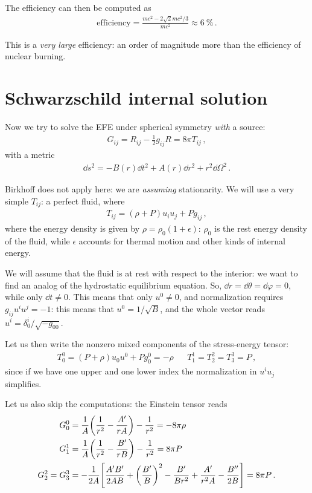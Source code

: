\documentclass[main.tex]{subfiles}
\begin{document}
The efficiency can then be computed as 
%
\begin{align}
\text{efficiency} = \frac{mc^2 - 2 \sqrt{2} mc^2 / 3}{mc^2} \approx \SI{6}{\percent}
\,.
\end{align}

This is a \emph{very large} efficiency: an order of magnitude more than the efficiency of nuclear burning. 

\section{Schwarzschild internal solution}

Now we try to solve the EFE under spherical symmetry \emph{with} a source: 
%
\begin{align}
G_{ij} = R_{ij} - \frac{1}{2} g_{ij} R = 8 \pi T_{ij}
\,,
\end{align}
%
with a metric 
%
\begin{align}
\dd{s^2} = - B(r) \dd{t^2} + A(r) \dd{r^2} + r^2 \dd{\Omega^2}
\,.
\end{align}

Birkhoff does not apply here: we are \emph{assuming} stationarity.
We will use a very simple \(T_{ij}\): a perfect fluid, where 
%
\begin{align}
T_{ij} 
= (\rho + P) u_i u_j + P g_{ij} 
\,,
\end{align}
%
where the energy density is given by \(\rho = \rho_0 ( 1+ \epsilon )\): \(\rho_0\) is the rest energy density of the fluid, while \(\epsilon \) accounts for thermal motion and other kinds of internal energy.

We will assume that the fluid is at rest with respect to the interior: we want to find an analog of the hydrostatic equilibrium equation. 
So, \(\dd{r} = \dd{\theta } = \dd{\varphi } = 0\), while only \(\dd{t} \neq 0\). This means that only \(u^{0} \neq 0\), and normalization requires \(g_{ij} u^{i} u^{j} = -1\): this means that \(u^{0} =  1/ \sqrt{B}\), and the whole vector reads \(u^{i} = \delta^{i}_{0} / \sqrt{-g_{00} }\).

Let us then write the nonzero mixed components of the stress-energy tensor: 
%
\begin{align}
T^{0}_{0} 
= (P + \rho ) u_0 u^0 + P g_{0}^{0}
=  -\rho && 
T^{1}_{1} = T^{2}_{2} = T^{3}_{3} = P
\,,
\end{align}
%
since if we have one upper and one lower index the normalization in \(u^{i} u_{j}\) simplifies. 

Let us also skip the computations: the Einstein tensor reads 
%
\begin{align}
G^{0}_{0} &= \frac{1}{A} \qty( \frac{1}{r^2} - \frac{A'}{rA}) - \frac{1}{r^2} = - 8 \pi \rho   \\
G^{1}_{1} &= \frac{1}{A} \qty( \frac{1}{r^2} - \frac{B'}{rB}) - \frac{1}{r^2} = 8 \pi  P  \\
G^{2}_{2} = G^{3}_{3}  &= - \frac{1}{2A} \qty[\frac{A'B'}{2AB} + \qty(\frac{B'}{B})^2 - \frac{B'}{Br^2} + \frac{A'}{r^2A} - \frac{B''}{2B}] = 8 \pi P
\,.
\end{align}
\end{document}
